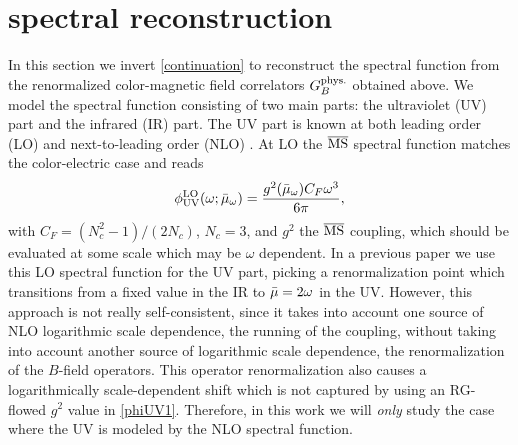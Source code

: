 \documentclass[floatfix,twocolumn,prd,showpacs,preprintnumbers,amsmath,nofootinbib,amssymb,superscriptaddress]{revtex4-2}
\begin{document}
\section{spectral reconstruction}
\label{sec:continue}

In this section we invert \cref{continuation} to reconstruct the spectral function from the renormalized color-magnetic field correlators $G_B^{\text{phys.}}$ obtained above.  We model the spectral function consisting of two main parts: the ultraviolet (UV) part and the infrared (IR) part. The UV part is known at both leading order (LO) \cite{Banerjee:2022uge} and next-to-leading order (NLO) \cite{Banerjee:2022uge}. At LO the $\overline{\text{MS}}$ spectral function matches the color-electric case and reads
\begin{align}
    \phi^{\mathrm{LO}}_{\rm{UV}}(\omega; \bar{\mu}_\omega) = \frac{g^2(\bar{\mu}_\omega) C_F \omega^3}{6\pi},
    \label{phiUV1}
\end{align}
with $C_F=(N_c^2-1)/(2N_c)$, $N_c=3$, and $g^2$ the $\overline{\text{MS}}$ coupling, which should be evaluated at some scale which may be $\omega$ dependent.
In a previous paper \cite{Altenkort:2023eav} we use this LO spectral function for the UV part, picking a renormalization point which transitions from a fixed value in the IR to $\bar{\mu} = 2\omega$ in the UV.
However, this approach is not really self-consistent, since it takes into account one source of NLO logarithmic scale dependence, the running of the coupling, without taking into account another source of logarithmic scale dependence, the renormalization of the $B$-field operators.
This operator renormalization also causes a logarithmically scale-dependent shift which is not captured by using an RG-flowed $g^2$ value in \cref{phiUV1}.
Therefore, in this work we will \textit{only} study the case where the UV is modeled by the NLO spectral function.
\end{document}
